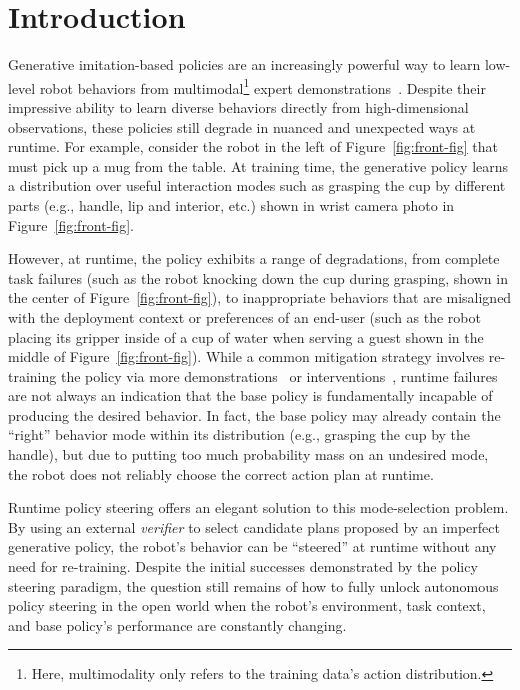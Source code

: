 \section{Introduction}
Generative imitation-based policies are an increasingly powerful way to learn low-level robot behaviors from multimodal\footnote{Here, multimodality only refers to the training data's action distribution.} expert demonstrations~\citep{chi2024diffusionpolicy, fu2024mobile,zhao2023learningfinegrainedbimanualmanipulation}. 
Despite their impressive ability to learn diverse behaviors directly from high-dimensional observations, these policies still degrade in nuanced and unexpected ways at runtime.  
For example, consider the robot in the left of Figure~\ref{fig:front-fig} that must pick up a mug from the table. 
At training time, the generative policy learns a distribution over useful interaction modes such as grasping the cup by different parts (e.g., handle, lip and interior, etc.) shown in wrist camera photo in Figure~\ref{fig:front-fig}.

However, at runtime, the policy exhibits a range of degradations, from complete task failures (such as the robot knocking down the cup during grasping, shown in 
the center of Figure~\ref{fig:front-fig}), to inappropriate behaviors that are misaligned with the deployment context or preferences of an end-user (such as the robot placing its gripper inside of a cup of water when serving a guest shown in the middle of Figure~\ref{fig:front-fig}). 
While a common mitigation strategy involves re-training the policy via more demonstrations~\citep{shafiullah2024supervised} or interventions~\citep{ross2010efficient, liumulti},  runtime failures are not always an indication that the base policy is fundamentally incapable of producing the desired behavior. 
In fact, the base policy may already contain the ``right'' behavior mode within its distribution (e.g., grasping the cup by the handle), but due to putting too much probability mass on an undesired mode, the robot does not reliably choose the correct action plan at runtime. 

Runtime policy steering \citep{nakamoto2024steering,wang2024inference} offers an elegant solution to this mode-selection problem. 
By using an external \textit{verifier}
to select candidate plans proposed by an imperfect generative policy, the robot's behavior can be ``steered'' at runtime without any need for re-training.
Despite the initial successes demonstrated by the policy steering paradigm, the question still remains of how to fully unlock autonomous policy steering in the open world when the robot's environment, task context, and base policy's performance are constantly changing.

